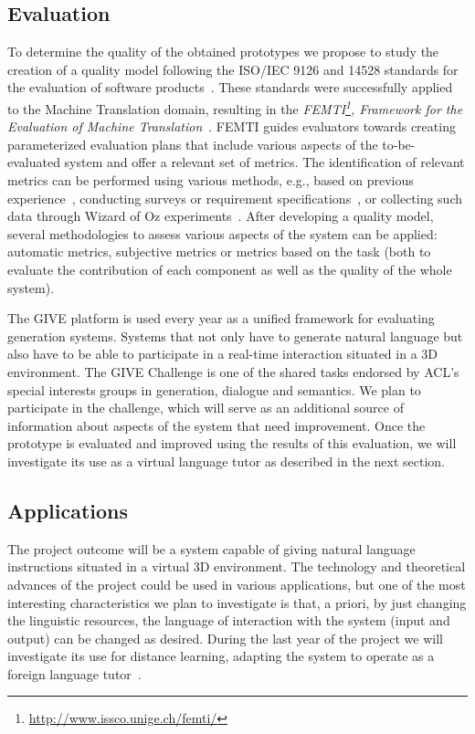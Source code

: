 \subsection{Evaluation}
To determine the quality of the obtained prototypes we propose to study the
creation of a quality model following the ISO/IEC
9126 and 14528 standards for the evaluation of software products~\cite{ISO9126-1,ISO14598-1}. These standards were successfully applied to
the Machine Translation domain, resulting in the 
\emph{FEMTI\footnote{\url{http://www.issco.unige.ch/femti/}}, Framework for the
Evaluation of
Machine Translation}~\cite{Est2005}. FEMTI
guides evaluators towards creating parameterized evaluation
plans that include various aspects of the to-be-evaluated system and offer a
relevant set of metrics. The identification of relevant metrics can be performed
using various methods, e.g., based on previous
experience~\cite{paradise06,Litman2002}, conducting
surveys or requirement specifications~\cite{Lecoeuche98}, or
collecting such data through Wizard of Oz
experiments~\cite{Dahlback93}.
After developing a quality model, several methodologies to assess
various aspects of the system can be applied: automatic metrics,
subjective metrics or metrics based on the task (both to
evaluate the contribution of each component as well as the quality of the whole
system). 

The GIVE platform is used every year as a unified framework for evaluating
generation systems. Systems that not only have to generate natural language
but also have to be able to participate in a real-time interaction situated in a
3D environment. The GIVE Challenge is one of the shared tasks endorsed by
ACL's special interests groups in generation, dialogue and semantics. We plan
to participate in the challenge, which will serve as an additional
source of information about aspects of the system that need
improvement.
Once the prototype is evaluated and improved using the results
of this evaluation, we will investigate its use as a virtual language tutor as
described in the next section.

\subsection{Applications}\label{applications}

The project outcome will be a system capable of giving natural language
instructions situated in a virtual 3D environment. The technology and
theoretical advances of the project could be used in various applications, but
one of the most interesting characteristics we plan to investigate is that, 
a priori, by just changing the linguistic resources, the language of interaction
with the system (input and output) can be changed as desired. During
the last year of the project we will investigate its use for distance learning,
adapting the system to operate as a foreign language tutor~\cite{Wik09}.

